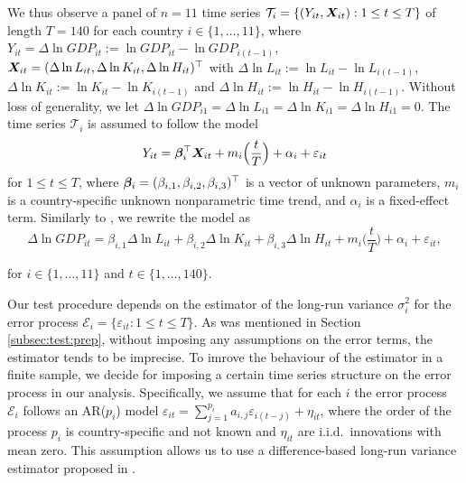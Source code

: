\documentclass[a4paper,12pt]{article}
\makeatletter
\renewcommand{\eqref}[1]{\tagform@{\ref{#1}}}
\makeatother
\begin{document}
We thus observe a panel of $n = 11$ time series $\mathcal{T}_i = \{(Y_{it}, \boldsymbol{X}_{it}): 1 \le t \le T \}$ of length $T = 140$ for each country $i \in \{1,\ldots,11\}$, where $Y_{it} = \Delta \ln GDP_{it} := \ln GDP_{it} - \ln GDP_{i(t-1)}$, $\boldsymbol{X}_{it} = (\Delta \ln L_{it}, \Delta \ln K_{it}, \Delta \ln H_{it})^\top$ with $\Delta \ln L_{it} := \ln L_{it} - \ln L_{i(t-1)}$, $\Delta \ln K_{it} := \ln K_{it} - \ln K_{i(t-1)}$ and $\Delta \ln H_{it} := \ln H_{it} - \ln H_{i(t-1)}$. Without loss of generality, we let $\Delta \ln GDP_{i1} = \Delta \ln L_{i1} = \Delta \ln K_{i1} = \Delta \ln H_{i1} = 0$. The time series $\mathcal{T}_i$ is assumed to follow the model 
\begin{equation}\label{eq:model:app}
Y_{it} = \bm{\beta}^\top_i \boldsymbol{X}_{it} + m_i \Big( \frac{t}{T} \Big) + \alpha_i + \varepsilon_{it} 
\end{equation}
for $1 \le t \le T$, where $\bm{\beta}_i = (\beta_{i, 1}, \beta_{i, 2}, \beta_{i, 3})^\top$ is a vector of unknown parameters, $m_i$ is a country-specific unknown nonparametric time trend, and $\alpha_i$ is a fixed-effect term. Similarly to \cite{Zhang2012}, we rewrite the model \eqref{eq:model:app} as
\begin{equation}\label{eq:model:app2}
\Delta \ln GDP_{it} = \beta_{i, 1} \Delta \ln L_{it} + \beta_{i, 2} \Delta \ln K_{it} + \beta_{i, 3} \Delta \ln H_{it} + m_i \Big( \frac{t}{T} \Big) + \alpha_i + \varepsilon_{it},
\end{equation}

for $i \in \{1, \ldots, 11\}$ and $t \in \{1, \ldots, 140\}$.

Our test procedure depends on the estimator of the long-run variance $\sigma_i^2$ for the error process $\mathcal{E}_i = \{\varepsilon_{it}: 1 \le t \le T\}$. As was mentioned in Section \ref{subsec:test:prep}, without imposing any assumptions on the error terms, the estimator tends to be imprecise. To imrove the behaviour of the estimator in a finite sample, we decide for imposing a certain time series structure on the error process in our analysis. Specifically, we assume that for each $i$ the error process $\mathcal{E}_i$ follows an AR($p_i$) model $\varepsilon_{it} = \sum_{j=1}^{p_i} a_{i, j} \varepsilon_{i(t-j)} + \eta_{it}$, where the order of the process $p_i$ is country-specific and not known and $\eta_{it}$ are i.i.d.\ innovations with mean zero. This assumption allows us to use a difference-based long-run variance estimator proposed in \cite{KhismatullinaVogt2020}.%
\end{document}
